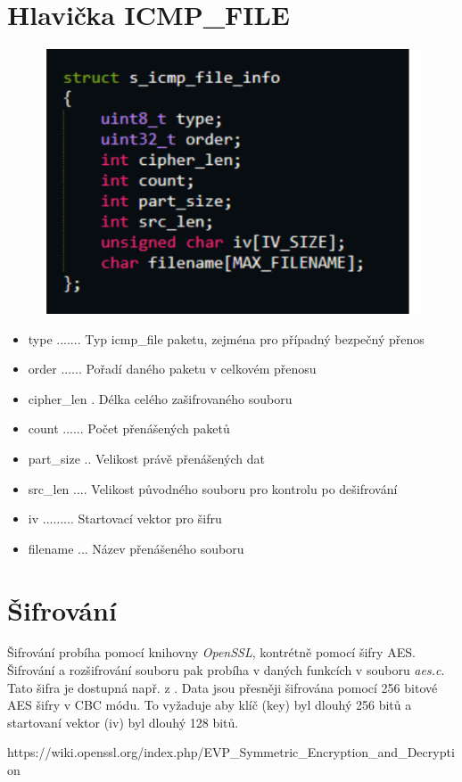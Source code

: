 \documentclass[a4paper, 11pt]{article}
\begin{document}
\section{Hlavička ICMP\_FILE}
\begin{figure}[h]
\includegraphics[scale=0.2]{img/struct.png}
\end{figure}
\begin{itemize}
\item type ....... Typ icmp\_file paketu, zejména pro případný bezpečný přenos
\item order ...... Pořadí daného paketu v celkovém přenosu
\item cipher\_len . Délka celého zašifrovaného souboru
\item count ...... Počet přenášených paketů
\item part\_size .. Velikost právě přenášených dat
\item src\_len .... Velikost původného souboru pro kontrolu po dešifrování
\item iv ......... Startovací vektor pro šifru
\item filename ... Název přenášeného souboru
\end{itemize}

\section{Šifrování}
Šifrování probíha pomocí knihovny \textit{OpenSSL}, kontrétně pomocí šifry AES. Šifrování a rozšifrování souboru pak probíha v daných funkcích v souboru \textit{aes.c}. Tato šifra je dostupná např. z \cite{aes}. Data jsou přesněji šifrována pomocí 256 bitové AES šifry v CBC módu. To vyžaduje aby klíč (key) byl dlouhý 256 bitů a startovaní vektor (iv) byl dlouhý 128 bitů.

\begin{thebibliography}{2}
https://wiki.openssl.org/index.php/EVP\_Symmetric\_Encryption\_and\_Decryption
\end{thebibliography}
\end{document}
